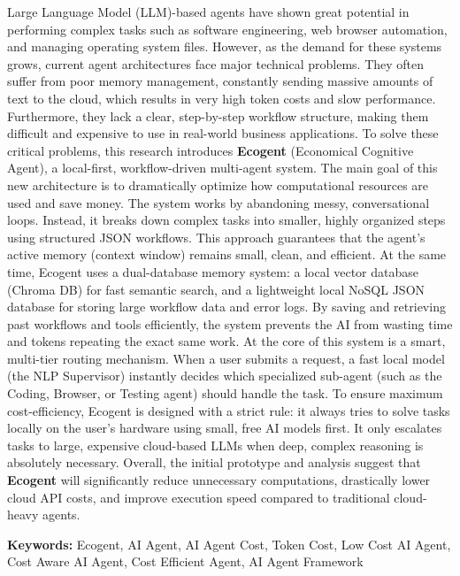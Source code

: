 Large Language Model (LLM)-based agents have shown great potential in performing complex tasks such as software engineering, web browser automation, and managing operating system files. However, as the demand for these systems grows, current agent architectures face major technical problems. They often suffer from poor memory management, constantly sending massive amounts of text to the cloud, which results in very high token costs and slow performance. Furthermore, they lack a clear, step-by-step workflow structure, making them difficult and expensive to use in real-world business applications. To solve these critical problems, this research introduces \textbf{Ecogent} (Economical Cognitive Agent), a local-first, workflow-driven multi-agent system. The main goal of this new architecture is to dramatically optimize how computational resources are used and save money. The system works by abandoning messy, conversational loops. Instead, it breaks down complex tasks into smaller, highly organized steps using structured JSON workflows. This approach guarantees that the agent's active memory (context window) remains small, clean, and efficient. At the same time, Ecogent uses a dual-database memory system: a local vector database (Chroma DB) for fast semantic search, and a lightweight local NoSQL JSON database for storing large workflow data and error logs. By saving and retrieving past workflows and tools efficiently, the system prevents the AI from wasting time and tokens repeating the exact same work. At the core of this system is a smart, multi-tier routing mechanism. When a user submits a request, a fast local model (the NLP Supervisor) instantly decides which specialized sub-agent (such as the Coding, Browser, or Testing agent) should handle the task. To ensure maximum cost-efficiency, Ecogent is designed with a strict rule: it always tries to solve tasks locally on the user's hardware using small, free AI models first. It only escalates tasks to large, expensive cloud-based LLMs when deep, complex reasoning is absolutely necessary. Overall, the initial prototype and analysis suggest that \textbf{Ecogent} will significantly reduce unnecessary computations, drastically lower cloud API costs, and improve execution speed compared to traditional cloud-heavy agents.

\vspace{1em}
\textbf{Keywords:} Ecogent, AI Agent, AI Agent Cost, Token Cost, Low Cost AI Agent, Cost Aware AI Agent, Cost Efficient Agent, AI Agent Framework